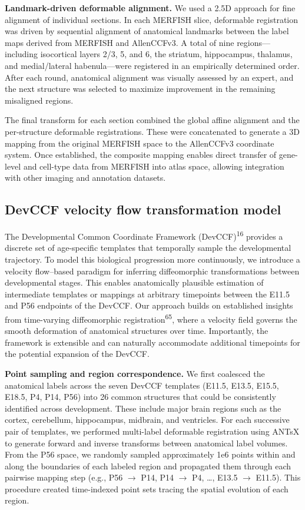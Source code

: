 \documentclass[
  12pt,
]{article}
\begin{document}
\textbf{Landmark-driven deformable alignment.} We used a 2.5D approach
for fine alignment of individual sections. In each MERFISH slice,
deformable registration was driven by sequential alignment of anatomical
landmarks between the label maps derived from MERFISH and AllenCCFv3. A
total of nine regions---including isocortical layers 2/3, 5, and 6, the
striatum, hippocampus, thalamus, and medial/lateral habenula---were
registered in an empirically determined order. After each round,
anatomical alignment was visually assessed by an expert, and the next
structure was selected to maximize improvement in the remaining
misaligned regions.

The final transform for each section combined the global affine
alignment and the per-structure deformable registrations. These were
concatenated to generate a 3D mapping from the original MERFISH space to
the AllenCCFv3 coordinate system. Once established, the composite
mapping enables direct transfer of gene-level and cell-type data from
MERFISH into atlas space, allowing integration with other imaging and
annotation datasets.

\subsection{DevCCF velocity flow transformation
model}\label{devccf-velocity-flow-transformation-model}

The Developmental Common Coordinate Framework
(DevCCF)\textsuperscript{16} provides a discrete set of age-specific
templates that temporally sample the developmental trajectory. To model
this biological progression more continuously, we introduce a velocity
flow--based paradigm for inferring diffeomorphic transformations between
developmental stages. This enables anatomically plausible estimation of
intermediate templates or mappings at arbitrary timepoints between the
E11.5 and P56 endpoints of the DevCCF. Our approach builds on
established insights from time-varying diffeomorphic
registration\textsuperscript{65}, where a velocity field governs the
smooth deformation of anatomical structures over time. Importantly, the
framework is extensible and can naturally accommodate additional
timepoints for the potential expansion of the DevCCF.

\textbf{Point sampling and region correspondence.} We first coalesced
the anatomical labels across the seven DevCCF templates (E11.5, E13.5,
E15.5, E18.5, P4, P14, P56) into 26 common structures that could be
consistently identified across development. These include major brain
regions such as the cortex, cerebellum, hippocampus, midbrain, and
ventricles. For each successive pair of templates, we performed
multi-label deformable registration using ANTsX to generate forward and
inverse transforms between anatomical label volumes. From the P56 space,
we randomly sampled approximately 1e6 points within and along the
boundaries of each labeled region and propagated them through each
pairwise mapping step (e.g., P56 \(\rightarrow\) P14, P14
\(\rightarrow\) P4, \ldots, E13.5 \(\rightarrow\) E11.5). This procedure
created time-indexed point sets tracing the spatial evolution of each
region.
\end{document}
